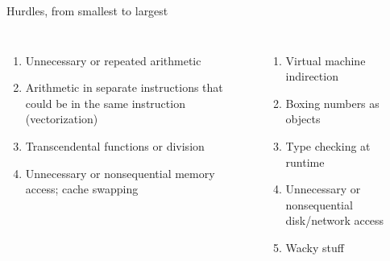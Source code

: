 \documentclass[aspectratio=169]{beamer}
\begin{document}
\begin{frame}{Hurdles, from smallest to largest}
\large
\begin{columns}[t]
\begin{enumerate}\setlength{\itemsep}{0.35 cm}
\item Unnecessary or repeated arithmetic
\item Arithmetic in separate instructions that could be in the same instruction (vectorization)
\item Transcendental functions or division
\item Unnecessary or nonsequential memory access; cache swapping
\end{enumerate}

\begin{enumerate}\setlength{\itemsep}{0.35 cm}\setcounter{enumi}{4}
\item Virtual machine indirection
\item Boxing numbers as objects
\item Type checking at runtime
\item Unnecessary or nonsequential disk/network access
\item Wacky stuff
\end{enumerate}
\end{columns}

\vspace{0.5 cm}

\vspace{0.2 cm}

\vspace{0.2 cm}
\end{frame}
\end{document}
